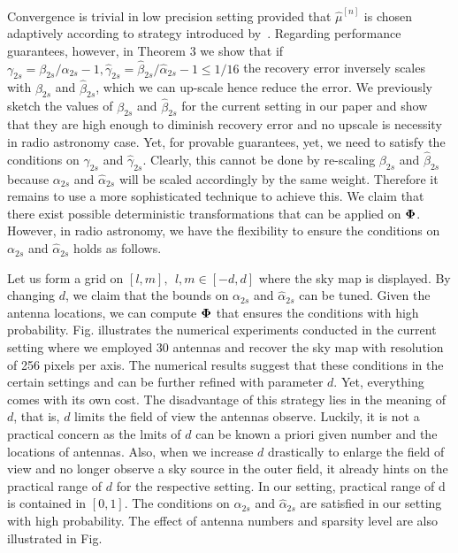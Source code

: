 \documentclass{article}
\begin{document}
Convergence is trivial in low precision setting provided that $\hat{\mu}^{[n]}$ is chosen adaptively according to strategy introduced by~\cite{blumensath2010niht}. Regarding performance guarantees, however, in Theorem 3 we show that if $\gamma_{2s} = \beta_{2s}/\alpha_{2s}-1, \hat{\gamma}_{2s} = \hat{\beta}_{2s}/\hat{\alpha}_{2s}-1\leq 1/16$ the recovery error inversely scales with $\beta_{2s}$ and $\hat{\beta}_{2s}$, which we can up-scale hence reduce the error. We previously sketch the values of $\beta_{2s}$ and $\hat{\beta}_{2s}$ for the current setting in our paper and show that they are high enough to diminish recovery error and no upscale is necessity in radio astronomy case. Yet, for provable guarantees, yet, we need to satisfy the conditions on $\gamma_{2s}$ and $\hat{\gamma}_{2s}$. Clearly, this cannot be done by re-scaling $\beta_{2s}$ and $\hat{\beta}_{2s}$ because $\alpha_{2s}$ and $\hat{\alpha}_{2s}$ will be scaled accordingly by the same weight. Therefore it remains to use a more sophisticated technique to achieve this. We claim that there exist possible deterministic transformations that can be applied on ${\bf \Phi}$. However, in radio astronomy, we have the flexibility to ensure the conditions on $\alpha_{2s}$ and $\hat{\alpha}_{2s}$ holds as follows. 

Let us form a grid on $[l, m], \  \ l, m \in [-d, d]$ where the sky map is displayed. By changing $d$, we claim that the bounds on $\alpha_{2s}$ and $\hat{\alpha}_{2s}$ can be tuned. Given the antenna locations, we can compute ${\bf \Phi}$ that ensures the conditions with high probability. Fig. illustrates the numerical experiments conducted in the current setting where we employed 30 antennas and recover the sky map with resolution of 256 pixels per axis. The numerical results suggest that these conditions in the certain settings and can be further refined with parameter $d$. Yet, everything comes with its own cost. The disadvantage of this strategy lies in the meaning of $d$, that is, $d$ limits the field of view the antennas observe. Luckily, it is not a practical concern as the lmits of $d$ can be known a priori given number and the locations of antennas. Also, when we increase $d$ drastically to enlarge the field of view and no longer observe a sky source in the outer field, it already hints on the practical range of $d$ for the respective setting. In our setting, practical range of d is contained in $[0, 1]$. The conditions on $\alpha_{2s}$ and $\hat{\alpha}_{2s}$ are satisfied in our setting with high probability. The effect of antenna numbers and sparsity level are also illustrated in Fig.
\end{document}

